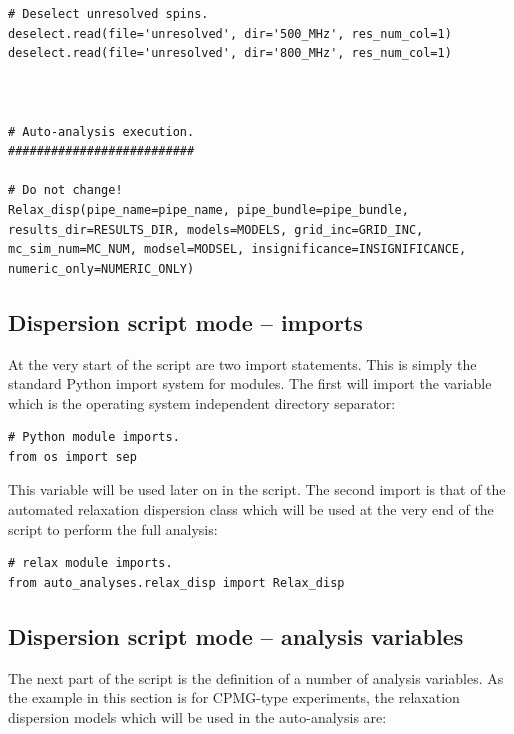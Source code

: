 \begin{lstlisting}
# Deselect unresolved spins.
deselect.read(file='unresolved', dir='500_MHz', res_num_col=1)
deselect.read(file='unresolved', dir='800_MHz', res_num_col=1)



# Auto-analysis execution.
##########################

# Do not change!
Relax_disp(pipe_name=pipe_name, pipe_bundle=pipe_bundle, results_dir=RESULTS_DIR, models=MODELS, grid_inc=GRID_INC, mc_sim_num=MC_NUM, modsel=MODSEL, insignificance=INSIGNIFICANCE, numeric_only=NUMERIC_ONLY)
\end{lstlisting}



\subsection{Dispersion script mode -- imports} \label{sect: dispersion script imports}

At the very start of the script are two import statements.  This is simply the standard Python import system for modules.  The first will import the  variable which is the operating system independent directory separator:

\begin{lstlisting}[firstnumber=4]
# Python module imports.
from os import sep
\end{lstlisting}

This  variable will be used later on in the script.  The second import is that of the automated relaxation dispersion class  which will be used at the very end of the script to perform the full analysis:

\begin{lstlisting}[firstnumber=7]
# relax module imports.
from auto_analyses.relax_disp import Relax_disp
\end{lstlisting}



\subsection{Dispersion script mode -- analysis variables} \label{sect: dispersion script variables}

The next part of the script is the definition of a number of analysis variables.  As the example in this section is for CPMG-type experiments, the relaxation dispersion models which will be used in the auto-analysis are:

